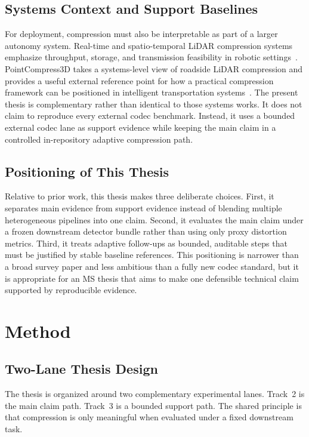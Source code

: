 \subsection{Systems Context and Support Baselines}
For deployment, compression must also be interpretable as part of a larger autonomy system. Real-time and spatio-temporal LiDAR compression systems emphasize throughput, storage, and transmission feasibility in robotic settings~\cite{feng_real-time_2020}. PointCompress3D takes a systems-level view of roadside LiDAR compression and provides a useful external reference point for how a practical compression framework can be positioned in intelligent transportation systems~\cite{zimmer2024pointcompress3d}. The present thesis is complementary rather than identical to those systems works. It does not claim to reproduce every external codec benchmark. Instead, it uses a bounded external codec lane as support evidence while keeping the main claim in a controlled in-repository adaptive compression path.

\subsection{Positioning of This Thesis}
Relative to prior work, this thesis makes three deliberate choices. First, it separates main evidence from support evidence instead of blending multiple heterogeneous pipelines into one claim. Second, it evaluates the main claim under a frozen downstream detector bundle rather than using only proxy distortion metrics. Third, it treats adaptive follow-ups as bounded, auditable steps that must be justified by stable baseline references. This positioning is narrower than a broad survey paper and less ambitious than a fully new codec standard, but it is appropriate for an MS thesis that aims to make one defensible technical claim supported by reproducible evidence.

\section{Method}\label{sec:method}

\subsection{Two-Lane Thesis Design}
The thesis is organized around two complementary experimental lanes. Track~2 is the main claim path. Track~3 is a bounded support path. The shared principle is that compression is only meaningful when evaluated under a fixed downstream task.

